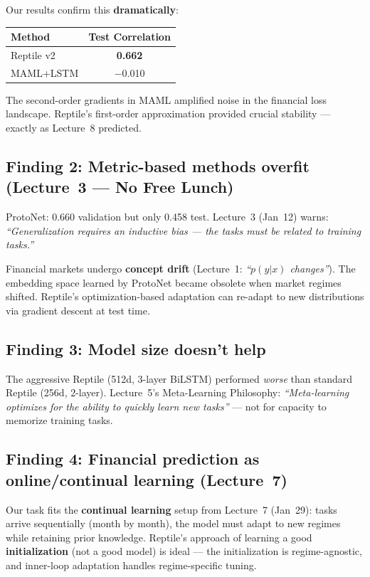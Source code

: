 \documentclass[11pt,a4paper]{article}
\begin{document}
Our results confirm this \textbf{dramatically}:
\begin{center}
\begin{tabular}{lc}
\toprule
\textbf{Method} & \textbf{Test Correlation} \\
\midrule
Reptile v2 & \textbf{0.662} \\
MAML+LSTM & $-$0.010 \\
\bottomrule
\end{tabular}
\end{center}

The second-order gradients in MAML amplified noise in the financial loss landscape. Reptile's first-order approximation provided crucial stability --- exactly as Lecture~8 predicted.

\subsection{Finding 2: Metric-based methods overfit (Lecture~3 --- No Free Lunch)}

ProtoNet: 0.660 validation but only 0.458 test. Lecture~3 (Jan~12) warns: \emph{``Generalization requires an inductive bias --- the tasks must be related to training tasks.''}

Financial markets undergo \textbf{concept drift} (Lecture~1: \emph{``$p(y|x)$ changes''}). The embedding space learned by ProtoNet became obsolete when market regimes shifted. Reptile's optimization-based adaptation can re-adapt to new distributions via gradient descent at test time.

\subsection{Finding 3: Model size doesn't help}

The aggressive Reptile (512d, 3-layer BiLSTM) performed \emph{worse} than standard Reptile (256d, 2-layer). Lecture~5's Meta-Learning Philosophy: \emph{``Meta-learning optimizes for the ability to quickly learn new tasks''} --- not for capacity to memorize training tasks.

\subsection{Finding 4: Financial prediction as online/continual learning (Lecture~7)}

Our task fits the \textbf{continual learning} setup from Lecture~7 (Jan~29): tasks arrive sequentially (month by month), the model must adapt to new regimes while retaining prior knowledge. Reptile's approach of learning a good \textbf{initialization} (not a good model) is ideal --- the initialization is regime-agnostic, and inner-loop adaptation handles regime-specific tuning.
\end{document}
